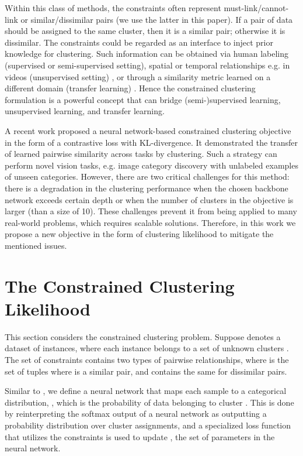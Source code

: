 \documentclass[10pt,twocolumn,letterpaper]{article}
\newcommand{\ZK}[1]{}
\begin{document}
Within this class of methods, the constraints often represent must-link/cannot-link or similar/dissimilar pairs (we use the latter in this paper). If a pair of data should be assigned to the same cluster, then it is a similar pair; otherwise it is dissimilar. The constraints could be regarded as an interface to inject prior knowledge for clustering. Such information can be obtained via human labeling (supervised or semi-supervised setting), spatial or temporal relationships e.g. in videos (unsupervised setting) \cite{Osep17arXiv}, or through a similarity metric learned on a different domain (transfer learning) \cite{Hsu18iclr}. Hence the constrained clustering formulation is a powerful concept that can bridge (semi-)supervised learning, unsupervised learning, and transfer learning.

A recent work \cite{Hsu18iclr} proposed a neural network-based constrained clustering objective in the form of a contrastive loss with KL-divergence. It demonstrated the transfer of learned pairwise similarity across tasks by clustering. Such a strategy can perform novel vision tasks, e.g. image category discovery with unlabeled examples of unseen categories. However, there are two critical challenges for this method: there is a degradation in the clustering performance when the chosen backbone network exceeds certain depth or when the number of clusters in the objective is larger (than a size of 10). These challenges prevent it from being applied to many real-world problems, which requires scalable solutions. Therefore, in this work we propose a new objective in the form of clustering likelihood to mitigate the mentioned issues.
\ZK{Might be hard to do space-wise but would be nice if intro included major contributions, or at least a sentence describing what we propose}
\section{The Constrained Clustering Likelihood}

This section considers the constrained clustering problem. Suppose  denotes a dataset of  instances, where each instance belongs to a set of unknown clusters . The set of constraints  contains two types of pairwise relationships, where  is the set of tuples  where  is a similar pair, and  contains the same for dissimilar pairs.

Similar to \cite{Hsu16iclrw,Hsu18iclr}, we define a neural network  that maps each sample  to a categorical distribution, \ie , which is the probability of data  belonging to cluster . This is done by reinterpreting the softmax output of a neural network as outputting a probability distribution over cluster assignments, and a specialized loss function that utilizes the constraints is used to update , the set of parameters in the neural network.
\end{document}
